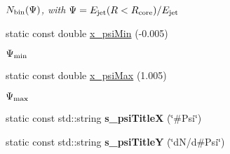\begin{CompactItemize}
\begin{CompactList}\small\item\em $N_{\rm bin}(\Psi)$, with $\Psi = E_{\rm jet}(R<R_{\rm core})/E_{\rm jet}$ \item\end{CompactList}\item 
\hypertarget{namespaceHistGroupCfg_88ca717c574a36e4cff4b4af1c383b5b}{
static const double \hyperlink{namespaceHistGroupCfg_88ca717c574a36e4cff4b4af1c383b5b}{x\_\-psi\-Min} (-0.005)}
\label{namespaceHistGroupCfg_88ca717c574a36e4cff4b4af1c383b5b}

\begin{CompactList}\small\item\em $\Psi_{\rm min}$ \item\end{CompactList}\item 
\hypertarget{namespaceHistGroupCfg_60196aab53d4d637a80fdc5a43ff06a7}{
static const double \hyperlink{namespaceHistGroupCfg_60196aab53d4d637a80fdc5a43ff06a7}{x\_\-psi\-Max} (1.005)}
\label{namespaceHistGroupCfg_60196aab53d4d637a80fdc5a43ff06a7}

\begin{CompactList}\small\item\em $\Psi_{\rm max}$ \item\end{CompactList}\item 
\hypertarget{namespaceHistGroupCfg_a90e87bd614cb79e819413cee56f799b}{
static const std::string \textbf{s\_\-psi\-Title\-X} (\char`\"{}\#Psi\char`\"{})}
\label{namespaceHistGroupCfg_a90e87bd614cb79e819413cee56f799b}

\item 
\hypertarget{namespaceHistGroupCfg_e9f916ef39270e0ca90f337c89dcbb84}{
static const std::string \textbf{s\_\-psi\-Title\-Y} (\char`\"{}d\-N/d\#Psi\char`\"{})}
\label{namespaceHistGroupCfg_e9f916ef39270e0ca90f337c89dcbb84}

\end{CompactItemize}
